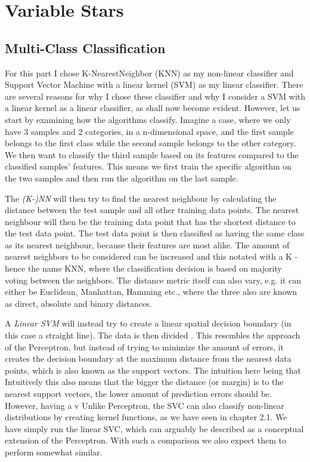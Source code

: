 \documentclass{article}
\theoremstyle{plain}
\theoremstyle{nonumberplain}
\begin{document}
\section{Variable Stars}

\subsection{Multi-Class Classification}

For this part I chose K-NearestNeighbor (KNN) as my non-linear classifier and Support Vector Machine with a linear kernel (SVM) as my linear classifier.
There are several reasons for why I chose these classifier and why I consider a SVM with a linear kernel as a linear classifier, as shall now become evident.
However, let us start by examining how the algorithms classify.
Imagine a case, where we only have 3 samples and 2 categories, in a n-dimensional space, and the first sample belongs to the first class while the second sample belongs to the other category.
We then want to classify the third sample based on its features compared to the classified samples' features. This means we first train the specific algorithm on the two samples and then run the algorithm on the last sample.

The \textit{(K-)NN} will then try to find the nearest neighbour by calculating the distance between the test sample and all other training data points. The nearest neighbour will then be the training data point that has the shortest distance to the test data point. The test data point is then classified as having the same class as its nearest neighbour, because their features are most alike.
The amount of nearest neighbors to be considered can be increased and this notated with a K - hence the name KNN, where the classification decision is based on majority voting between the neighbors. 
The distance metric itself can also vary, e.g. it can either be Euclidean, Manhattan, Hamming etc., where the three also are known as direct, absolute and binary distances.

A \textit{Linear SVM} will instead try to create a linear spatial decision boundary (in this case a straight line). The data is then divided   . This resembles the approach of the Perceptron, but instead of trying to minimize the amount of errors, it creates the decision boundary at the maximum distance from the nearest data points, which is also known as the support vectors.
The intuition here being that
Intuitively this also means that the bigger the distance (or margin) is to the nearest support vectors, the lower amount of prediction errors should be. However, having a v Unlike Perceptron, the SVC can also classify non-linear distributions by creating kernel functions, as we have seen in chapter 2.1. We have simply run the linear SVC, which can arguably be described as a conceptual extension of the Perceptron. With such a comparison we also expect them to perform somewhat similar. \medskip
\end{document}
